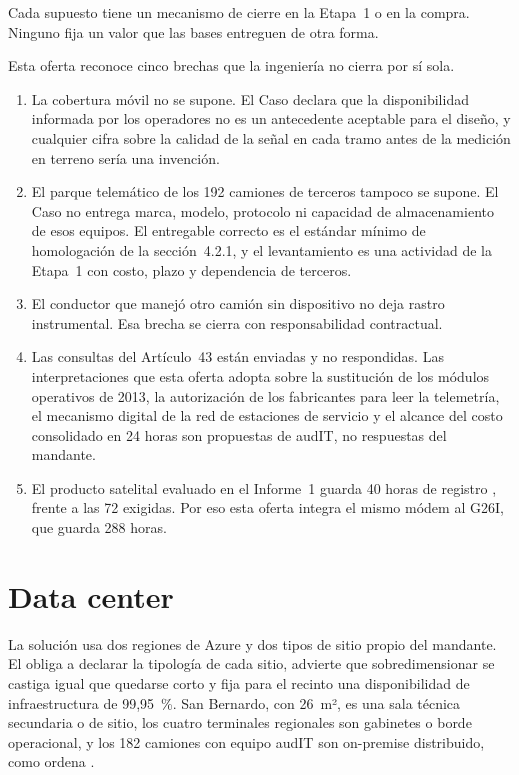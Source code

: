 Cada supuesto tiene un mecanismo de cierre en la Etapa~1 o en la compra. Ninguno fija un valor que las
bases entreguen de otra forma.

Esta oferta reconoce cinco brechas que la ingeniería no cierra por sí sola.

\begin{enumerate}
\item La cobertura móvil no se supone. El Caso declara que la disponibilidad informada por los
operadores no es un antecedente aceptable para el diseño, y cualquier cifra sobre la calidad de la
señal en cada tramo antes de la medición en terreno sería una invención.
\item El parque telemático de los 192 camiones de terceros tampoco se supone. El Caso no entrega marca,
modelo, protocolo ni capacidad de almacenamiento de esos equipos. El entregable correcto es el
estándar mínimo de homologación de la sección~4.2.1, y el levantamiento es una actividad de la Etapa~1
con costo, plazo y dependencia de terceros.
\item El conductor que manejó otro camión sin dispositivo no deja rastro instrumental. Esa brecha se
cierra con responsabilidad contractual.
\item Las consultas del Artículo~43 están enviadas y no respondidas. Las interpretaciones que esta
oferta adopta sobre la sustitución de los módulos operativos de 2013, la autorización de los
fabricantes para leer la telemetría, el mecanismo digital de la red de estaciones de servicio y el
alcance del costo consolidado en 24 horas son propuestas de audIT, no respuestas del mandante.
\item El producto satelital evaluado en el Informe~1 guarda 40 horas de registro \parencite{webfleet_sat_cl},
frente a las 72 exigidas. Por eso esta oferta integra el mismo módem al G26I, que guarda 288 horas.
\end{enumerate}

\section{Data center}\label{sec:4-datacenter}

La solución usa dos regiones de Azure y dos tipos de sitio propio del mandante. El  obliga a declarar la tipología de cada sitio, advierte que sobredimensionar se castiga igual
que quedarse corto y fija para el recinto una disponibilidad de infraestructura de 99,95~\%. San Bernardo,
con 26~m², es una sala técnica secundaria o de sitio, los cuatro terminales regionales son gabinetes o
borde operacional, y los 182 camiones con equipo audIT son on-premise distribuido, como ordena
.

